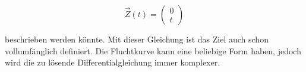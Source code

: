 \begin{equation}
    \vec{Z}(t)
    =
    \left( \begin{array}{c} 0 \\  t \end{array} \right)
\end{equation}

beschrieben werden könnte.
Mit dieser Gleichung ist das Ziel auch schon vollumfänglich definiert.
Die Fluchtkurve kann eine beliebige Form haben, jedoch wird die zu lösende Differentialgleichung immer komplexer.




